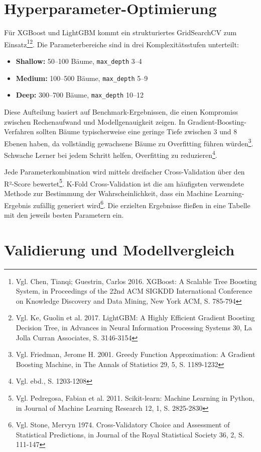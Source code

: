 \section{Hyperparameter-Optimierung}

Für XGBoost und LightGBM kommt ein strukturiertes GridSearchCV zum Einsatz\footnote{Vgl. Chen, Tianqi; Guestrin, Carlos 2016. XGBoost: A Scalable Tree Boosting System, in Proceedings of the 22nd ACM SIGKDD International Conference on Knowledge Discovery and Data Mining, New York ACM, S. 785-794}\footnote{Vgl. Ke, Guolin et al. 2017. LightGBM: A Highly Efficient Gradient Boosting Decision Tree, in Advances in Neural Information Processing Systems 30, La Jolla Curran Associates, S. 3146-3154}. Die Parameterbereiche sind in drei Komplexitätsstufen unterteilt:

\begin{itemize}
  \item \textbf{Shallow:} 50–100 Bäume, \texttt{max\_depth} 3–4
  \item \textbf{Medium:} 100–500 Bäume, \texttt{max\_depth} 5–9
  \item \textbf{Deep:} 300–700 Bäume, \texttt{max\_depth} 10–12
\end{itemize}

Diese Aufteilung basiert auf Benchmark-Ergebnissen, die einen Kompromiss zwischen Rechenaufwand und Modellgenauigkeit zeigen. In Gradient-Boosting-Verfahren sollten Bäume typischerweise eine geringe Tiefe zwischen 3 und 8 Ebenen haben, da vollständig gewachsene Bäume zu Overfitting führen würden\footnote{Vgl. Friedman, Jerome H. 2001. Greedy Function Approximation: A Gradient Boosting Machine, in The Annals of Statistics 29, 5, S. 1189-1232}. Schwache Lerner bei jedem Schritt helfen, Overfitting zu reduzieren\footnote{Vgl. ebd., S. 1203-1208}.

Jede Parameterkombination wird mittels dreifacher Cross-Validation über den R²-Score bewertet\footnote{Vgl. Pedregosa, Fabian et al. 2011. Scikit-learn: Machine Learning in Python, in Journal of Machine Learning Research 12, 1, S. 2825-2830}. K-Fold Cross-Validation ist die am häufigsten verwendete Methode zur Bestimmung der Wahrscheinlichkeit, dass ein Machine Learning-Ergebnis zufällig generiert wird\footnote{Vgl. Stone, Mervyn 1974. Cross-Validatory Choice and Assessment of Statistical Predictions, in Journal of the Royal Statistical Society 36, 2, S. 111-147}. Die erzielten Ergebnisse fließen in eine Tabelle mit den jeweils besten Parametern ein.

\section{Validierung und Modellvergleich}


